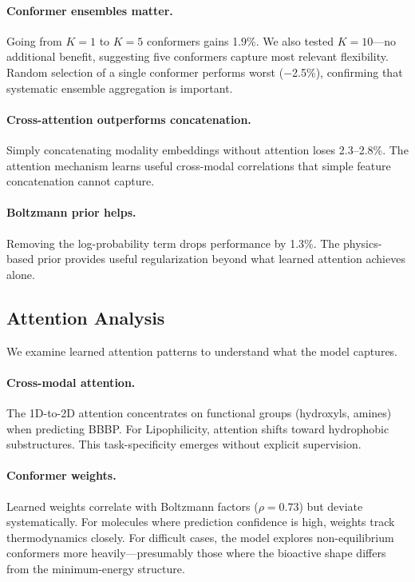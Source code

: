 \documentclass[11pt]{article}
\begin{document}
\paragraph{Conformer ensembles matter.} Going from $K=1$ to $K=5$ conformers gains 1.9\%. We also tested $K=10$---no additional benefit, suggesting five conformers capture most relevant flexibility. Random selection of a single conformer performs worst ($-$2.5\%), confirming that systematic ensemble aggregation is important.

\paragraph{Cross-attention outperforms concatenation.} Simply concatenating modality embeddings without attention loses 2.3--2.8\%. The attention mechanism learns useful cross-modal correlations that simple feature concatenation cannot capture.

\paragraph{Boltzmann prior helps.} Removing the log-probability term drops performance by 1.3\%. The physics-based prior provides useful regularization beyond what learned attention achieves alone.

\subsection{Attention Analysis}

We examine learned attention patterns to understand what the model captures.

\paragraph{Cross-modal attention.} The 1D-to-2D attention concentrates on functional groups (hydroxyls, amines) when predicting BBBP. For Lipophilicity, attention shifts toward hydrophobic substructures. This task-specificity emerges without explicit supervision.

\paragraph{Conformer weights.} Learned weights correlate with Boltzmann factors ($\rho = 0.73$) but deviate systematically. For molecules where prediction confidence is high, weights track thermodynamics closely. For difficult cases, the model explores non-equilibrium conformers more heavily---presumably those where the bioactive shape differs from the minimum-energy structure.
\end{document}
